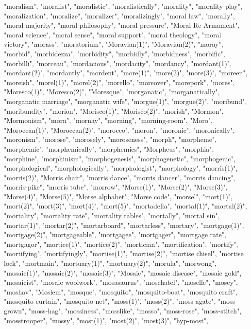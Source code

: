 "moralism",
"moralist",
"moralistic",
"moralistically",
"morality",
"morality play",
"moralization",
"moralize",
"moralizer",
"moralizingly",
"moral law",
"morally",
"moral majority",
"moral philosophy",
"moral pressure",
"Moral Re-Armament",
"moral science",
"moral sense",
"moral support",
"moral theology",
"moral victory",
"morass",
"moratorium",
"Moravian(1)",
"Moravian(2)",
"moray",
"morbid",
"morbidezza",
"morbidity",
"morbidly",
"morbidness",
"morbific",
"morbilli",
"morceau",
"mordacious",
"mordacity",
"mordancy",
"mordant(1)",
"mordant(2)",
"mordantly",
"mordent",
"more(1)",
"more(2)",
"more(3)",
"moreen",
"moreish",
"morel(1)",
"morel(2)",
"morello",
"moreover",
"morepork",
"mores",
"Moresco(1)",
"Moresco(2)",
"Moresque",
"morganatic",
"morganatically",
"morganatic marriage",
"morganatic wife",
"morgue(1)",
"morgue(2)",
"moribund",
"moribundity",
"morion",
"Morisco(1)",
"Morisco(2)",
"morish",
"Mormon",
"Mormonism",
"morn",
"mornay",
"morning",
"morning-room",
"Moro",
"Moroccan(1)",
"Moroccan(2)",
"morocco",
"moron",
"moronic",
"moronically",
"moronism",
"morose",
"morosely",
"moroseness",
"morph",
"morpheme",
"morphemic",
"morphemically",
"morphemics",
"Morpheus",
"morphia",
"morphine",
"morphinism",
"morphogenesis",
"morphogenetic",
"morphogenic",
"morphological",
"morphologically",
"morphologist",
"morphology",
"morris(1)",
"morris(2)",
"Morris chair",
"morris dance",
"morris dancer",
"morris dancing",
"morris-pike",
"morris tube",
"morrow",
"Morse(1)",
"Morse(2)",
"Morse(3)",
"Morse(4)",
"Morse(5)",
"Morse alphabet",
"Morse code",
"morsel",
"mort(1)",
"mort(2)",
"mort(3)",
"mort(4)",
"mort(5)",
"mortadella",
"mortal(1)",
"mortal(2)",
"mortality",
"mortality rate",
"mortality tables",
"mortally",
"mortal sin",
"mortar(1)",
"mortar(2)",
"mortarboard",
"mortarless",
"mortary",
"mortgage(1)",
"mortgage(2)",
"mortgageable",
"mortgagee",
"mortgager",
"mortgage rate",
"mortgagor",
"mortice(1)",
"mortice(2)",
"mortician",
"mortification",
"mortify",
"mortifying",
"mortifyingly",
"mortise(1)",
"mortise(2)",
"mortise chisel",
"mortise lock",
"mortmain",
"mortuary(1)",
"mortuary(2)",
"morula",
"morwong",
"mosaic(1)",
"mosaic(2)",
"mosaic(3)",
"Mosaic",
"mosaic disease",
"mosaic gold",
"mosaicist",
"mosaic woolwork",
"mosasaurus",
"moschatel",
"moselle",
"mosey",
"moshav",
"Moslem",
"mosque",
"mosquito",
"mosquito-boat",
"mosquito craft",
"mosquito curtain",
"mosquito-net",
"moss(1)",
"moss(2)",
"moss agate",
"moss-grown",
"moss-hag",
"mossiness",
"mosslike",
"mosso",
"moss-rose",
"moss-stitch",
"mosstrooper",
"mossy",
"most(1)",
"most(2)",
"most(3)",
"hyp-most",
